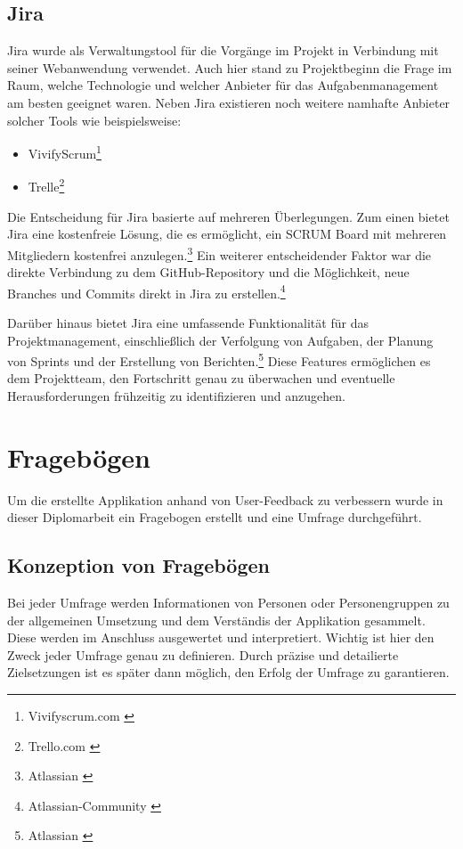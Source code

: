 \subsection{Jira}
Jira wurde als Verwaltungstool für die Vorgänge im Projekt in Verbindung mit seiner Webanwendung verwendet. Auch hier
stand zu Projektbeginn die Frage im Raum, welche Technologie und welcher Anbieter für das Aufgabenmanagement am besten
geeignet waren. Neben Jira existieren noch weitere namhafte Anbieter solcher Tools wie beispielsweise:
\begin{itemize}
    \item VivifyScrum\footnote{Vivifyscrum.com \cite{VivifyScrum Website}}
    \item Trelle\footnote{Trello.com \cite{Trello Website}}
\end{itemize}

Die Entscheidung für Jira basierte auf mehreren Überlegungen. Zum einen bietet Jira eine kostenfreie Lösung, die es
ermöglicht, ein SCRUM Board mit mehreren Mitgliedern kostenfrei anzulegen.\footnote{Atlassian \cite{Tarife und Preise vergleichen}}  Ein weiterer entscheidender Faktor war die
direkte Verbindung zu dem GitHub-Repository und die Möglichkeit, neue Branches und Commits direkt in Jira zu erstellen.\footnote{Atlassian-Community \cite{How to connect a GitHub account to Jira Software}}

Darüber hinaus bietet Jira eine umfassende Funktionalität für das Projektmanagement, einschließlich der Verfolgung von
Aufgaben, der Planung von Sprints und der Erstellung von Berichten.\footnote{Atlassian \cite{Im Team schneller vorankommen, an einem Strang ziehen und besser entwickeln}} Diese Features ermöglichen es dem Projektteam, den
Fortschritt genau zu überwachen und eventuelle Herausforderungen frühzeitig zu identifizieren und anzugehen.

\section{Fragebögen}
Um die erstellte Applikation anhand von User-Feedback zu verbessern wurde in dieser Diplomarbeit ein Fragebogen erstellt
und eine Umfrage durchgeführt.

\subsection{Konzeption von Fragebögen}
Bei jeder Umfrage werden Informationen von Personen oder Personengruppen zu der allgemeinen
Umsetzung und dem Verständis der Applikation gesammelt. Diese werden im Anschluss ausgewertet und
interpretiert. Wichtig ist hier den Zweck jeder Umfrage genau zu definieren. Durch präzise und
detailierte Zielsetzungen ist es später dann möglich, den Erfolg der Umfrage zu garantieren.

